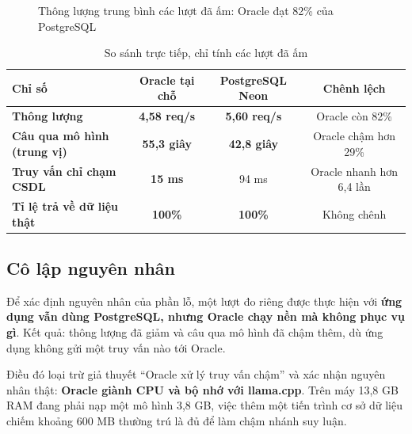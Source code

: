 \documentclass[12pt,a4paper]{article}
\newcommand{\ok}[1]{\textcolor{successgreen}{\bfseries #1}}
\newcommand{\bad}[1]{\textcolor{dangerred}{\bfseries #1}}
\begin{document}
\begin{figure}[H]
\centering
{}
\caption{Thông lượng trung bình các lượt đã ấm: Oracle đạt 82\% của PostgreSQL}
\end{figure}

\begin{table}[H]
\centering
\caption{So sánh trực tiếp, chỉ tính các lượt đã ấm}
\label{tab:soam}
\begin{tabularx}{\textwidth}{>{\bfseries}Xccc}
\toprule
\rowcolor{lightblue}
Chỉ số & Oracle tại chỗ & PostgreSQL Neon & Chênh lệch\\
\midrule
Thông lượng & \bad{4,58 req/s} & \ok{5,60 req/s} & Oracle còn 82\%\\
Câu qua mô hình (trung vị) & \bad{55,3 giây} & \ok{42,8 giây} & Oracle chậm hơn 29\%\\
Truy vấn chỉ chạm CSDL & \ok{15 ms} & 94 ms & Oracle nhanh hơn 6,4 lần\\
Tỉ lệ trả về dữ liệu thật & \ok{100\%} & \ok{100\%} & Không chênh\\
\bottomrule
\end{tabularx}
\end{table}

\subsection{Cô lập nguyên nhân}

Để xác định nguyên nhân của phần lỗ, một lượt đo riêng được thực hiện với
\textbf{ứng dụng vẫn dùng PostgreSQL, nhưng Oracle chạy nền mà không phục vụ gì}.
Kết quả: thông lượng đã giảm và câu qua mô hình đã chậm thêm, dù ứng dụng không
gửi một truy vấn nào tới Oracle.

Điều đó loại trừ giả thuyết ``Oracle xử lý truy vấn chậm'' và xác nhận nguyên
nhân thật: \textbf{Oracle giành CPU và bộ nhớ với llama.cpp}. Trên máy 13,8 GB
RAM đang phải nạp một mô hình 3,8 GB, việc thêm một tiến trình cơ sở dữ liệu
chiếm khoảng 600 MB thường trú là đủ để làm chậm nhánh suy luận.
\end{document}
